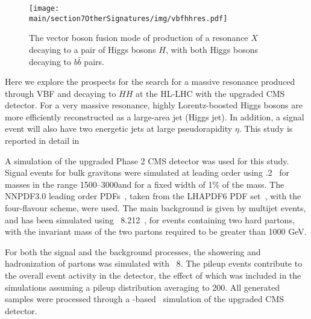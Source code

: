 
\begin{figure}[htbp]
  \begin{center}
    \texttt{[image: \\main/section7OtherSignatures/img/vbfhhres.pdf]}
    \caption{The vector boson fusion mode of production of a resonance $X$ decaying to a pair of Higgs bosons $ H $, with both Higgs bosons decaying to $ b\bar{b} $ pairs.}
    \label{fig_tdr:feyn}
  \end{center}
\end{figure}

Here we explore the prospects for the search for a massive resonance produced through VBF and decaying to $HH$ at the HL-LHC with the upgraded CMS detector. For a very massive resonance, highly Lorentz-boosted Higgs bosons are more efficiently reconstructed as a large-area jet (Higgs jet). In addition, a signal event will also have two energetic jets at large pseudorapidity $\eta$. This study is reported in detail in 


A simulation of the upgraded Phase 2 CMS detector was used for this study. 
Signal events for bulk gravitons were simulated at leading order using {.2}~\cite{MG5_aMCNLO} for 
masses in the range 1500--3000\GeV and for a fixed width of 1\% of the mass. The {NNPDF3.0} leading order PDFs~\cite{Ball:2014uwa}, taken from the {LHAPDF6} PDF set~\cite{Harland-Lang:2014zoa,Buckley:2014ana,Carrazza:2015hva,Butterworth:2015oua}, with the four-flavour scheme, were used. The main background is given by multijet events, and has been simulated using \PYTHIA~8.212~\cite{Pythia8p2}, for events containing two hard partons, with the invariant mass of the two partons required to be greater than 1000 GeV.

For both the signal and the background processes, the showering and hadronization of partons was simulated with \PYTHIA~8. 
The pileup events contribute to the overall event activity in the detector, the effect of which was included in the simulations assuming a pileup distribution averaging to 200.
All generated samples were processed through a \GEANTfour-based~\cite{Agostinelli:2002hh,GEANT} simulation of the upgraded CMS detector.

